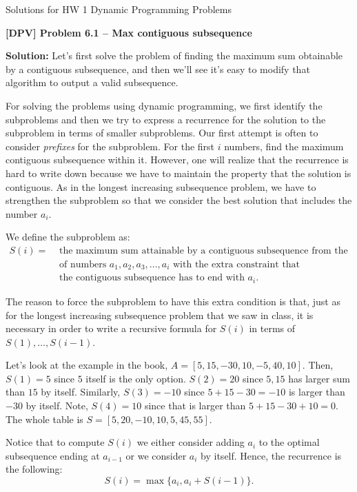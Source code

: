 \documentclass[12pt]{article}
\begin{document}
\begin{center}
{\large 
Solutions for HW 1 Dynamic Programming Problems} \\
\end{center}

{\noindent \bf [DPV] Problem 6.1 --  Max contiguous subsequence}

{\noindent \bf Solution:}
Let's first solve the problem of finding the maximum sum obtainable by a contiguous
subsequence, and then we'll see it's easy to modify that algorithm to output a valid
subsequence.

For solving the problems using dynamic programming, we first identify the subproblems and then
we try to express a recurrence for the solution to the subproblem in
terms of smaller subproblems.
Our first attempt is often to consider {\em prefixes} for the subproblem.
For the first $i$ numbers, find the maximum contiguous subsequence within it.
However, one will realize that the recurrence is hard to write down because we have to
maintain  the property that the solution is contiguous.
As in the longest increasing
subsequence problem, we have to strengthen the subproblem so that we consider
the best solution that includes the number $a_i$.

We define the subproblem as:
\begin{eqnarray*}
S(i) = & \mbox{ the maximum sum attainable by a contiguous subsequence from the list } \\
& \mbox{ of numbers $a_1,a_2,a_3,...,a_i$ with the extra constraint that } \\
& \mbox{ the contiguous subsequence has to end with $a_i$. }
\end{eqnarray*}

The reason to force the subproblem to have this extra condition is that, just
as for the longest increasing subsequence problem that we saw in class, it is 
necessary in order to write a recursive formula for $S(i)$ in terms of $S(1),\dots, S(i-1)$.

Let's look at the example in the book, $A = [5, 15, -30, 10, -5, 40, 10]$.
Then, $S(1) = 5$ since $5$ itself is the only option.
$S(2)=20$ since $5,15$ has larger sum than $15$ by itself.
Similarly, $S(3) = -10$ since $5+15-30 =-10$ is larger than $-30$ by itself.
Note, $S(4)=10$ since that is larger than $5+15-30+10=0$.
The whole table is $S = [5, 20, -10, 10, 5, 45, 55]$.

Notice that to compute $S(i)$ we either consider adding $a_i$ to the optimal
subsequence ending at $a_{i-1}$ or we consider $a_i$ by itself.
Hence, the recurrence is the following:
\[ S(i) = \max\{ a_i, a_i+S(i-1)\}.
\]
\end{document}
